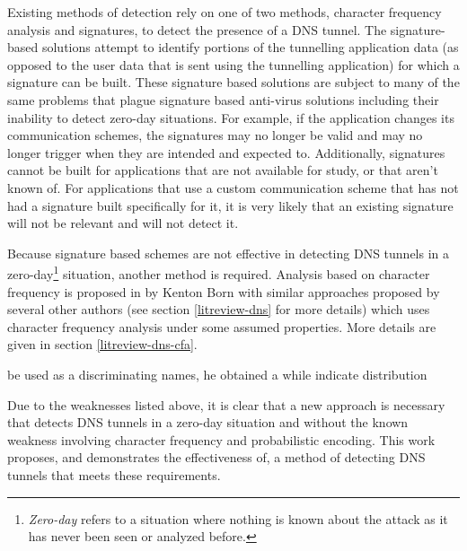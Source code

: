 \documentclass[12pt]{report}
\theoremstyle{remark}
\theoremstyle{definition}
\theoremstyle{definition}
\theoremstyle{definition}
\begin{document}
Existing methods of detection rely on one of two methods, character frequency
analysis and signatures, to detect the presence of a DNS tunnel. The
signature-based solutions attempt to identify portions of the tunnelling
application data (as opposed to the user data that is sent using the tunnelling
application) for which a signature can be built. These signature based solutions
are subject to many of the same problems that plague signature based anti-virus
solutions including their inability to detect zero-day situations. For example,
if the application changes its communication schemes, the signatures may no
longer be valid and may no longer trigger when they are intended and expected
to. Additionally, signatures cannot be built for applications that are not
available for study, or that aren't known of. For applications that use a custom
communication scheme that has not had a signature built specifically for it, it
is very likely that an existing signature will not be relevant and will not
detect it.

Because signature based schemes are not effective in detecting DNS tunnels in a
zero-day\footnote{\emph{Zero-day} refers to a situation where nothing is known
about the attack as it has never been seen or analyzed before.} situation,
another method is required. Analysis based on character frequency is proposed
in\cite{Born2010.cfa} by Kenton Born with similar approaches proposed by several
other authors (see section \ref{litreview-dns} for more details) which uses
character frequency analysis under some assumed properties. More details are
given in section \ref{litreview-dns-cfa}.

be used as a discriminating %
names, he obtained a %
while %
indicate %
distribution %

Due to the weaknesses listed above, it is clear that a new approach is necessary
that detects DNS tunnels in a zero-day situation and without the known weakness
involving character frequency and probabilistic encoding. This work proposes,
and demonstrates the effectiveness of, a method of detecting DNS tunnels that
meets these requirements.
\end{document}
